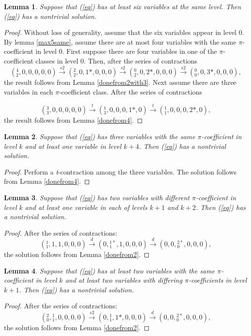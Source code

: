 \documentclass[draft]{publmathdeb}
\newtheorem{lemma}{Lemma}
\begin{document}
\begin{lemma}\label{max6}
Suppose that (\ref{eq}) has at least six variables at the same level.  Then (\ref{eq}) has a nontrivial solution.
\end{lemma}
\begin{proof}
Without loss of generality, assume that the six variables appear in level 0.  By lemma \ref{max5same}, assume there are at most four variables with the same $\pi$-coefficient in level 0.  First suppose there are four variables in one of the $\pi$-coefficient classes in level 0.  Then, after the series of contractions
$$(^{4}_{2},0,0,0,0,0) \xrightarrow{s2}
(^{2}_{2},0,1*,0,0,0) \xrightarrow{s2}
(^{0}_{2},0,2*,0,0,0) \xrightarrow{s2}
(^{0}_{0},0,3*,0,0,0),$$
the result follows from Lemma \ref{donefrom2with3}.  Next assume there are three variables in each $\pi$-coefficient class.  After the series of contractions 

$$(^{3}_{3},0,0,0,0,0) \xrightarrow{t}
(^{1}_{3},0,0,0,1*,0) \xrightarrow{t}
(^{1}_{1},0,0,0,2*,0),$$
the result follows from Lemma \ref{donefrom4}.
\end{proof}

\begin{lemma} \label{doneaftert}
Suppose that (\ref{eq}) has three variables with the same $\pi$-coefficient in level $k$ and at least one variable in level $k+4$.  Then (\ref{eq}) has a nontrivial solution.
\end{lemma}
\begin{proof}
Perform a \textit{t}-contraction among the three variables.  The solution follows from Lemma \ref{donefrom4}.
\end{proof}

\begin{lemma} \label{doneafterd}
Suppose that (\ref{eq}) has two variables with different $\pi$-coefficient in level $k$ and at least one variable in each of levels $k+1$ and $k+2$.  Then (\ref{eq}) has a nontrivial solution.
\end{lemma}
\begin{proof}

After the series of contractions: $$(^{1}_{1},1,1,0,0,0) \xrightarrow{d}
(0,{}^{1*}_{1},1,0,0,0) \xrightarrow{d}
(0,0,{}^{2*}_{0},0,0,0),$$
the solution follows from Lemma \ref{donefrom2}.
\end{proof}

\begin{lemma} \label{doneafterds2}
Suppose that (\ref{eq}) has at least two variables with the same $\pi$-coefficient in level $k$ and at least two variables with differing $\pi$-coefficients in level $k+1$.  Then (\ref{eq}) has a nontrivial solution.
\end{lemma}
\begin{proof}
After the series of contractions:
$$(^{2}_{0},{}^{1}_{1},0,0,0,0) \xrightarrow{s2}
(0,{}^{1}_{1},1*,0,0,0) \xrightarrow{d}
(0,0,{}^{2*}_{0},0,0,0),$$
the solution follows from Lemma \ref{donefrom2}.
\end{proof}
\end{document}
